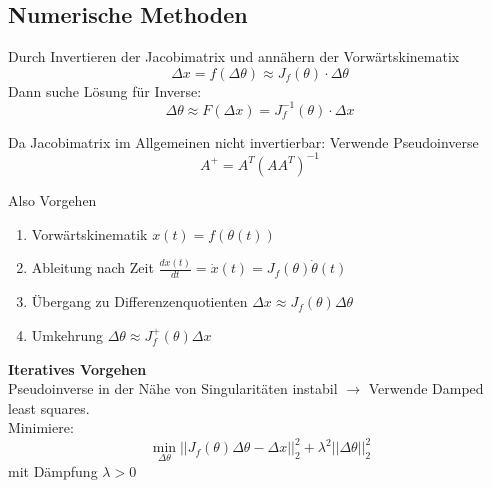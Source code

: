 \subsection{Numerische Methoden}
Durch Invertieren der Jacobimatrix und annähern der Vorwärtskinematix
\[\Delta x = f(\Delta \theta) \approx J_f(\theta) \cdot \Delta \theta\]
Dann suche Lösung für Inverse:
\[\Delta \theta \approx F(\Delta x) = J_f^{-1}(\theta) \cdot \Delta x\]

Da Jacobimatrix im Allgemeinen nicht invertierbar: Verwende Pseudoinverse
\[A^+ = A^T{(AA^T)}^{-1}\]

Also Vorgehen
\begin{enumerate}
\item Vorwärtskinematik \(x(t) = f(\theta(t))\)
\item Ableitung nach Zeit \(\frac{dx(t)}{dt} = \dot{x}(t) = J_f(\theta)\dot{\theta}(t)\)
\item Übergang zu Differenzenquotienten \(\Delta x \approx J_f(\theta)\Delta\theta\)
\item Umkehrung \(\Delta\theta \approx J_f^+(\theta)\Delta x\)
\end{enumerate}

\textbf{Iteratives Vorgehen}\\
Pseudoinverse in der Nähe von Singularitäten instabil \(\rightarrow\) Verwende Damped least squares.\\
Minimiere:
\[\min_{\Delta\theta}||J_f(\theta)\Delta\theta - \Delta x||^2_2 + \lambda^2||\Delta\theta||^2_2\]
mit Dämpfung \(\lambda > 0\)